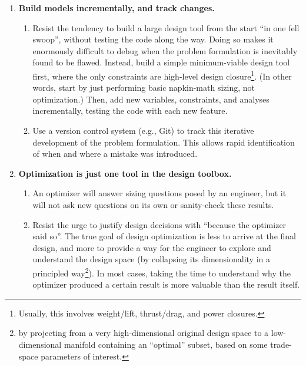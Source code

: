 \begin{enumerate}
\begin{enumerate}
        \item Another common cause of strange results is high-dimensional design problems that optimize around a single operating point \cite{drela_pros_1998}. This can lead to extremely brittle designs that ostensibly perform well in a narrow region around the design point but poorly elsewhere (and in practice).
        \item If initial guesses or problem scales are off by many orders of magnitude, this can also cause slow convergence\footnote{However, typically these factors will not affect the value of the optimum, if it is found. This is true if a) an optimizer like IPOPT is used, which only terminates when KKT-like local optimality conditions are satisfied, and b) the problem is not multimodal enough that convergence to a different local minimum is a concern.}. Strong nonconvexities (e.g., a model interpolating noisy data) can also cause problems.
    \end{enumerate}
    \item \textbf{Build models incrementally, and track changes.}
    \begin{enumerate}
        \item Resist the tendency to build a large design tool from the start ``in one fell swoop'', without testing the code along the way. Doing so makes it enormously difficult to debug when the problem formulation is inevitably found to be flawed. Instead, build a simple minimum-viable design tool first, where the only constraints are high-level design closure\footnote{Usually, this involves weight/lift, thrust/drag, and power closures.}. (In other words, start by just performing basic napkin-math sizing, not optimization.) Then, add new variables, constraints, and analyses incrementally, testing the code with each new feature.
        \item Use a version control system (e.g., Git) to track this iterative development of the problem formulation. This allows rapid identification of when and where a mistake was introduced.
    \end{enumerate}
    \item \textbf{Optimization is just one tool in the design toolbox.}
    \begin{enumerate}
        \item An optimizer will answer sizing questions posed by an engineer, but it will not ask new questions on its own or sanity-check these results.
        \item Resist the urge to justify design decisions with ``because the optimizer said so''. The true goal of design optimization is less to arrive at the final design, and more to provide a way for the engineer to explore and understand the design space (by collapsing its dimensionality in a principled way\footnote{by projecting from a very high-dimensional original design space to a low-dimensional manifold containing an ``optimal'' subset, based on some trade-space parameters of interest.}). In most cases, taking the time to understand why the optimizer produced a certain result is more valuable than the result itself.
    \end{enumerate}
\end{enumerate}